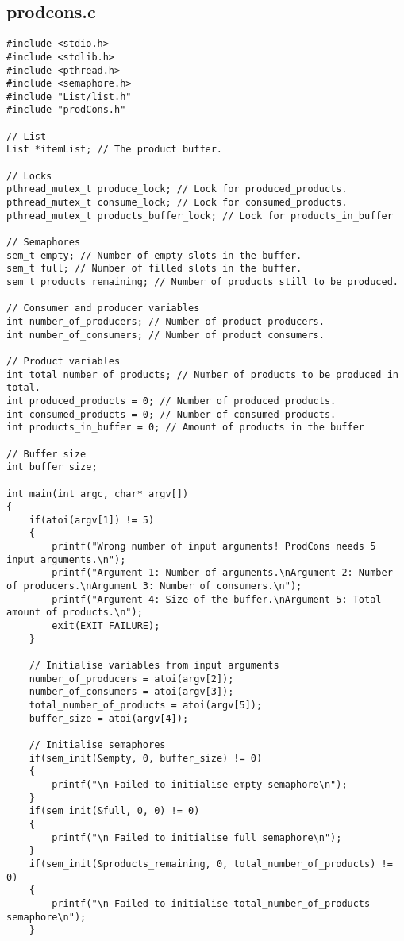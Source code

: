 \subsection{prodcons.c}
\begin{lstlisting}
#include <stdio.h>
#include <stdlib.h>
#include <pthread.h>
#include <semaphore.h>
#include "List/list.h"
#include "prodCons.h"

// List
List *itemList; // The product buffer.

// Locks
pthread_mutex_t produce_lock; // Lock for produced_products.
pthread_mutex_t consume_lock; // Lock for consumed_products.
pthread_mutex_t products_buffer_lock; // Lock for products_in_buffer

// Semaphores
sem_t empty; // Number of empty slots in the buffer.
sem_t full; // Number of filled slots in the buffer.
sem_t products_remaining; // Number of products still to be produced.

// Consumer and producer variables
int number_of_producers; // Number of product producers.
int number_of_consumers; // Number of product consumers.

// Product variables
int total_number_of_products; // Number of products to be produced in total.
int produced_products = 0; // Number of produced products.
int consumed_products = 0; // Number of consumed products.
int products_in_buffer = 0; // Amount of products in the buffer

// Buffer size
int buffer_size;

int main(int argc, char* argv[])
{
	if(atoi(argv[1]) != 5)
	{
		printf("Wrong number of input arguments! ProdCons needs 5 input arguments.\n");
		printf("Argument 1: Number of arguments.\nArgument 2: Number of producers.\nArgument 3: Number of consumers.\n");
		printf("Argument 4: Size of the buffer.\nArgument 5: Total amount of products.\n");
		exit(EXIT_FAILURE);
	}

	// Initialise variables from input arguments
	number_of_producers = atoi(argv[2]);
	number_of_consumers = atoi(argv[3]);
	total_number_of_products = atoi(argv[5]);
	buffer_size = atoi(argv[4]);

	// Initialise semaphores
	if(sem_init(&empty, 0, buffer_size) != 0)
	{
		printf("\n Failed to initialise empty semaphore\n");
	}
	if(sem_init(&full, 0, 0) != 0)
	{
		printf("\n Failed to initialise full semaphore\n");
	}
	if(sem_init(&products_remaining, 0, total_number_of_products) != 0)
	{
		printf("\n Failed to initialise total_number_of_products semaphore\n");
	}


\end{lstlisting}
